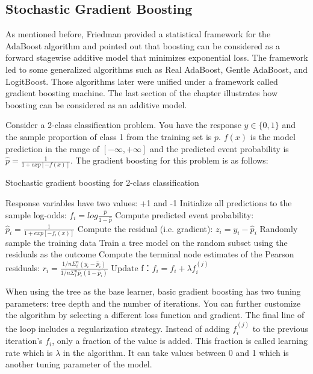 \documentclass[12pt,]{krantz}
\begin{document}
\hypertarget{stochastic-gradient-boosting}{%
\subsection{Stochastic Gradient Boosting}\label{stochastic-gradient-boosting}}

As mentioned before, Friedman \citep{Friedman2000} provided a statistical framework for the AdaBoost algorithm and pointed out that boosting can be considered as a forward stagewise additive model that minimizes exponential loss. The framework led to some generalized algorithms such as Real AdaBoost, Gentle AdaBoost, and LogitBoost. Those algorithms later were unified under a framework called gradient boosting machine. The last section of the chapter illustrates how boosting can be considered as an additive model.

Consider a 2-class classification problem. You have the response \(y \in \{0, 1\}\) and the sample proportion of class 1 from the training set is \(p\). \(f(x)\) is the model prediction in the range of \([-\infty, +\infty]\) and the predicted event probability is \(\hat{p}=\frac{1}{1+exp[-f(x)]}\). The gradient boosting for this problem is as follows:

\begin{algorithm}
\caption{Stochastic gradient boosting for 2-class classification}\label{gbmalgorithm} 
\begin{algorithmic}[1] 
\State Response variables have two values: +1 and -1
\State Initialize all  predictions to the sample log-odds: $f_{i} = log \frac{\hat{p}}{1- \hat{p}}$
    \State Compute predicted event probability:  $\hat{p}_i=\frac{1}{1+exp[-f_{i}(x)]}$
    \State Compute the residual (i.e. gradient): $z_i=y_i-\hat{p}_i$
    \State Randomly sample the training data
    \State Train a tree model on the random subset using the residuals as the outcome
    \State Compute the terminal node estimates of the Pearson residuals: $r_i=\frac{1/n\Sigma_i^n(y_i-\hat{p}_i)}{1/n\Sigma_i^n\hat{p}_i(1-\hat{p}_i)}$
    \State Update f：$f_i=f_i+\lambda f_i^{(j)}$
\EndFor
\end{algorithmic}
\end{algorithm}

When using the tree as the base learner, basic gradient boosting has two tuning parameters: tree depth and the number of iterations. You can further customize the algorithm by selecting a different loss function and gradient\citep{Hastie2008}. The final line of the loop includes a regularization strategy. Instead of adding \(f_i^{(j)}\) to the previous iteration's \(f_i\), only a fraction of the value is added. This fraction is called learning rate which is \(\lambda\) in the algorithm. It can take values between 0 and 1 which is another tuning parameter of the model.
\end{document}
